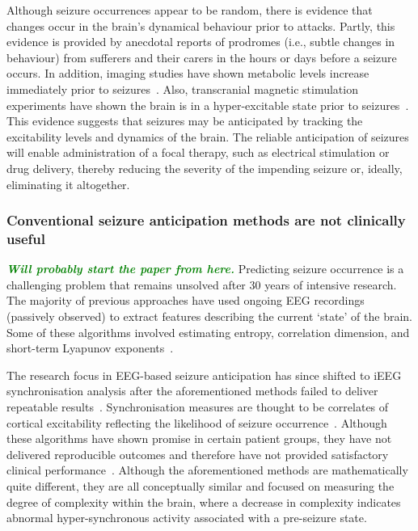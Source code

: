 \documentclass[]{article}
\newcommand{\dean}[1]{\textsf{\emph{\textbf{\textcolor{green}{#1}}}}}
\begin{document}
Although seizure occurrences appear to be random, there is evidence that changes occur in the brain’s dynamical behaviour prior to attacks. Partly, this evidence is provided by anecdotal reports of prodromes (i.e., subtle changes in behaviour) from sufferers and their carers in the hours or days before a seizure occurs. In addition, imaging studies have shown metabolic levels increase immediately prior to seizures~\cite{Zhao2007}. Also, transcranial magnetic stimulation experiments have shown the brain is in a hyper-excitable state prior to seizures~\cite{Badawy2009,Wright2006}. This evidence suggests that seizures may be anticipated by tracking the excitability levels and dynamics of the brain. The reliable anticipation of seizures will enable administration of a focal therapy, such as electrical stimulation or drug delivery, thereby reducing the severity of the impending seizure or, ideally, eliminating it altogether. 

\subsubsection{Conventional seizure anticipation methods are not clinically useful}
\dean{Will probably start the paper from here.}
Predicting seizure occurrence is a challenging problem that remains unsolved after 30 years of intensive research. The majority of previous approaches have used ongoing EEG recordings (passively observed) to extract features describing the current ‘state’ of the brain. Some of these algorithms involved estimating entropy, correlation dimension, and short-term Lyapunov exponents~\cite{Babloyantz1986, Pijn1991, Pritchard1995, Iasemidis1996, LeVanQuyen2001}. 

The research focus in EEG-based seizure anticipation has since shifted to iEEG synchronisation analysis after the aforementioned methods failed to deliver repeatable results~\cite{Lai2003, McSharry2003, Maiwald2004, Lai2004}. Synchronisation measures are thought to be correlates of cortical excitability reflecting the likelihood of seizure occurrence~\cite{Kalitzin2002}. Although these algorithms have shown promise in certain patient groups, they have not delivered reproducible outcomes and therefore have not provided satisfactory clinical performance~\cite{Lehnertz2007, Mormann2007}. 
Although the aforementioned methods are mathematically quite different, they are all conceptually similar and focused on measuring the degree of complexity within the brain, where a decrease in complexity indicates abnormal hyper-synchronous activity associated with a pre-seizure state. 
\end{document}
